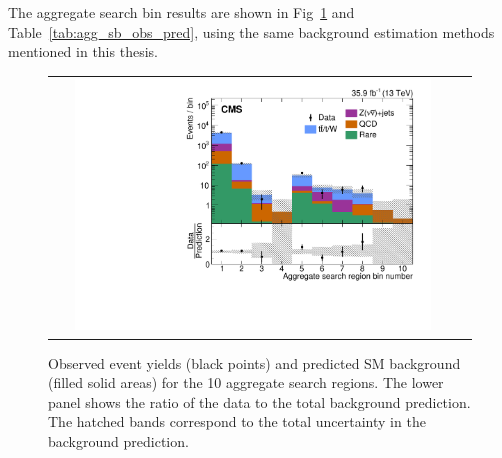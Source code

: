 The aggregate search bin results are shown in Fig~\ref{fig:aggSearchBinResults} and Table~\ref{tab:agg_sb_obs_pred}, using the same background estimation methods mentioned in this thesis.

\begin{figure}[htb]
  \begin{center}
  \begin{tabular}{cc}
  \includegraphics[angle=0,width=0.9\textwidth]{figures/appendix/aggregatedSearchBins.pdf}
  \end{tabular}
  \caption{
  Observed event yields (black points)
  and predicted SM background (filled solid areas)
  for the 10 aggregate search regions.
  The lower panel shows the ratio of the data to
  the total background prediction.
  The hatched bands correspond to the total uncertainty in the
  background prediction.
   }
    \label{fig:aggSearchBinResults}
  \end{center}
\end{figure}

